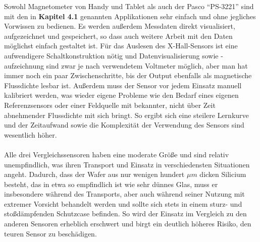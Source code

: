 \documentclass[12pt, a4paper]{article}
\begin{document}
Sowohl Magnetometer von Handy und Tablet als auch der Pasco ``PS-3221'' sind mit den in \textbf{Kapitel 4.1} genannten Applikationen sehr einfach und ohne jegliches Vorwissen zu bedienen. Es werden außerdem Messdaten direkt visualisiert, aufgezeichnet und gespeichert, so dass auch weitere Arbeit mit den Daten möglichst einfach gestaltet ist.\newline
Für das Auslesen des X-Hall-Sensors ist eine aufwendigere Schaltkonstruktion nötig und Datenvisualisierung sowie -aufzeichnung sind zwar je nach verwendetem Voltmeter möglich, aber man hat immer noch ein paar Zwischenschritte, bis der Output ebenfalls als magnetische Flussdichte lesbar ist. Außerdem muss der Sensor vor jedem Einsatz manuell kalibriert werden, was wieder eigene Probleme wie den Bedarf eines eigenen Referenzsensors oder einer Feldquelle mit bekannter, nicht über Zeit abnehmender Flussdichte mit sich bringt. So ergibt sich eine steilere Lernkurve und der Zeitaufwand sowie die Komplexität der Verwendung des Sensors sind wesentlich höher.\paragraph{}

Alle drei Vergleichssensoren haben eine moderate Größe und sind relativ unempfindlich, was ihren Transport und Einsatz in verschiedensten Situationen angeht.\newline
Dadurch, dass der Wafer aus nur wenigen hundert $\mu{m}$ dicken Silicium besteht, das in etwa so empfindlich ist wie sehr dünnes Glas, muss er insbesondere während des Transports, aber auch während seiner Nutzung mit extremer Vorsicht behandelt werden und sollte sich stets in einem sturz- und stoßdämpfenden Schutzcase befinden. So wird der Einsatz im Vergleich zu den anderen Sensoren erheblich erschwert und birgt ein deutlich höheres Risiko, den teuren Sensor zu beschädigen.\paragraph{}
\end{document}
